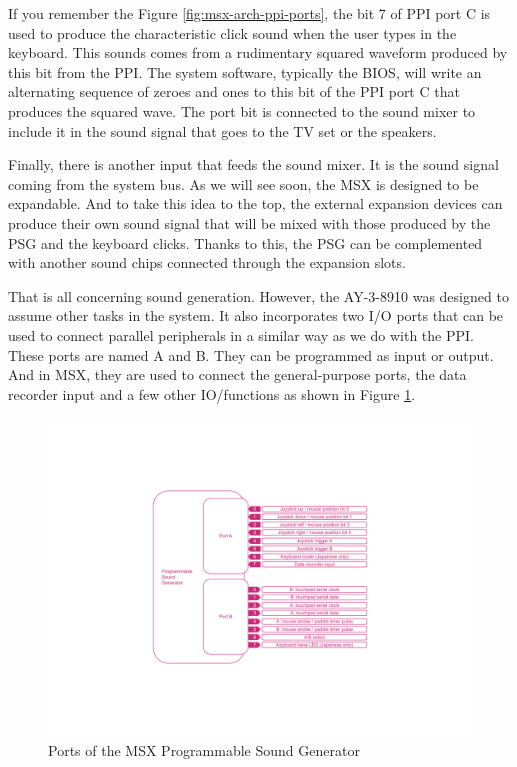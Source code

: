 If you remember the Figure \ref{fig:msx-arch-ppi-ports}, the bit 7 of PPI port C is used to produce the characteristic click sound when the user types in the keyboard. This sounds comes from a rudimentary squared waveform produced by this bit from the PPI. The system software, typically the BIOS, will write an alternating sequence of zeroes and ones to this bit of the PPI port C that produces the squared wave. The port bit is connected to the sound mixer to include it in the sound signal that goes to the TV set or the speakers. 

Finally, there is another input that feeds the sound mixer. It is the sound signal coming from the system bus. As we will see soon, the MSX is designed to be expandable. And to take this idea to the top, the external expansion devices can produce their own sound signal that will be mixed with those produced by the PSG and the keyboard clicks. Thanks to this, the PSG can be complemented with another sound chips connected through the expansion slots. 

That is all concerning sound generation. However, the AY-3-8910 was designed to assume other tasks in the system. It also incorporates two I/O ports that can be used to connect parallel peripherals in a similar way as we do with the PPI. These ports are named A and B. They can be programmed as input or output. And in MSX, they are used to connect the general-purpose ports, the data recorder input and a few other IO/functions as shown in Figure \ref{fig:msx-arch-psg-ports}. 

\begin{figure}
	\centering
	\includegraphics[width=1\linewidth,trim={0cm 120 0 100}]{images/figures/msx-arch-psg-ports}
	\caption{Ports of the MSX Programmable Sound Generator}
	\label{fig:msx-arch-psg-ports}
\end{figure}

